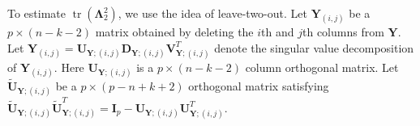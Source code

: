 \documentclass[12pt]{article} %
\DeclareMathOperator{\mytr}{tr}
\DeclareMathOperator{\myE}{E}
\DeclareMathOperator{\myVar}{Var}
\newcommand{\bY}{\mathbf{Y}}
\newcommand{\bI}{\mathbf{I}}
\newcommand{\bU}{\mathbf{U}}
\newcommand{\bD}{\mathbf{D}}
\newcommand{\bV}{\mathbf{V}}
\newcommand{\bfsym}[1]{\ensuremath{\boldsymbol{#1}}}
\def\bLambda {\bfsym {\Lambda}}
\def\bSigma {\bfsym {\Sigma}}
\newtheorem{proposition}{Proposition}
\theoremstyle{definition}
\begin{document}


 To estimate $\mytr(\bLambda_2^2)$,
    we use the idea of leave-two-out.
    Let $\bY_{(i,j)}$ be a $p\times (n-k-2)$ matrix obtained by deleting the $i$th and $j$th columns from $\bY$.
    Let $\bY_{(i,j)}=\bU_{\bY;{(i,j)}}\bD_{\bY;{(i,j)}}\bV_{\bY;{(i,j)}}^T$ denote the singular value decomposition of $\bY_{(i,j)}$.
    Here $\bU_{\bY;{(i,j)}}$ is a $p\times (n-k-2)$ column orthogonal matrix.
    Let $\tilde{\bU}_{\bY;{(i,j)}}$ be a $p\times (p-n+k+2)$ orthogonal matrix satisfying $\tilde{\bU}_{\bY;{(i,j)}}\tilde{\bU}_{\bY;{(i,j)}}^T=\bI_{p}-\bU_{\bY;{(i,j)}}\bU_{\bY;{(i,j)}}^T$.
\end{document}
